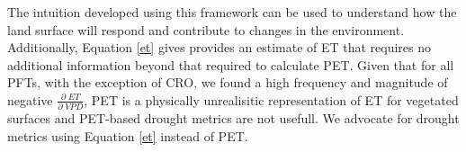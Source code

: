 \documentclass[draft,linenumbers]{agujournal}
\begin{document}
The intuition developed using this framework can be used to understand how the land surface will respond and contribute to changes in the environment. Additionally, Equation \ref{et} gives provides an estimate of ET that requires no additional information beyond that required to calculate PET. Given that for all PFTs, with the exception of CRO, we found a high frequency and magnitude of negative $\frac{\partial \; ET}{\partial \; VPD}$, PET is a physically unrealisitic representation of ET for vegetated surfaces and PET-based drought metrics are not usefull. We advocate for drought metrics using Equation \ref{et} instead of PET. 


  

%
%
%
%
%
%
%
%

%
% 
\end{document}
